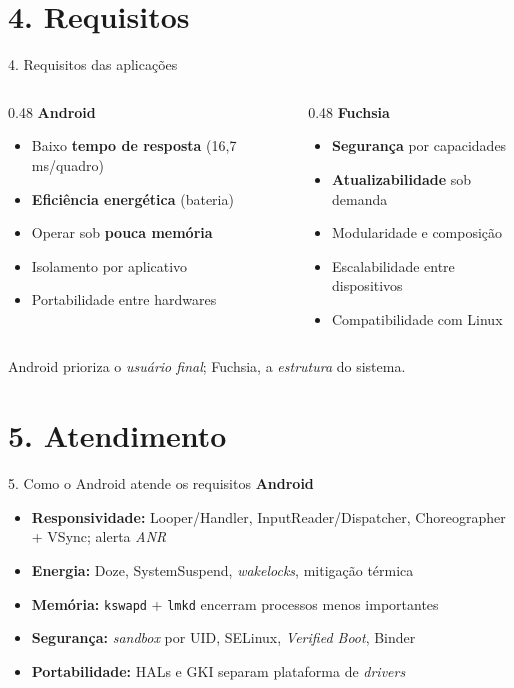 \documentclass[aspectratio=169,11pt]{beamer}
\newcommand{\ANDROID}{\textbf{\color{androidVerde}Android}}
\newcommand{\FUCHSIA}{\textbf{\color{fuchsiaCor}Fuchsia}}
\newcommand{\comparar}[2]{%
  \begin{columns}[T,onlytextwidth]
    \begin{column}{0.48\textwidth}
      \ANDROID\par\smallskip
      \begin{itemize}\footnotesize #1 \end{itemize}
    \end{column}
    \begin{column}{0.48\textwidth}
      \FUCHSIA\par\smallskip
      \begin{itemize}\footnotesize #2 \end{itemize}
    \end{column}
  \end{columns}%
}
\begin{document}
\section{4. Requisitos}

\begin{frame}{4. Requisitos das aplicações}
  \comparar{
    \item Baixo \textbf{tempo de resposta} (16,7 ms/quadro)
    \item \textbf{Eficiência energética} (bateria)
    \item Operar sob \textbf{pouca memória}
    \item Isolamento por aplicativo
    \item Portabilidade entre hardwares
  }{
    \item \textbf{Segurança} por capacidades
    \item \textbf{Atualizabilidade} sob demanda
    \item Modularidade e composição
    \item Escalabilidade entre dispositivos
    \item Compatibilidade com Linux
  }
  \vfill
  \begin{center}\small
    Android prioriza o \emph{usuário final}; Fuchsia, a \emph{estrutura} do sistema.
  \end{center}
\end{frame}

\section{5. Atendimento}

\begin{frame}{5. Como o Android atende os requisitos}
  \ANDROID
  \begin{itemize}\footnotesize
    \item \textbf{Responsividade:} Looper/Handler, InputReader/Dispatcher, Choreographer + VSync; alerta \emph{ANR}
    \item \textbf{Energia:} Doze, SystemSuspend, \emph{wakelocks}, mitigação térmica
    \item \textbf{Memória:} \texttt{kswapd} + \texttt{lmkd} encerram processos menos importantes
    \item \textbf{Segurança:} \emph{sandbox} por UID, SELinux, \emph{Verified Boot}, Binder
    \item \textbf{Portabilidade:} HALs e GKI separam plataforma de \emph{drivers}
  \end{itemize}
\end{frame}
\end{document}
